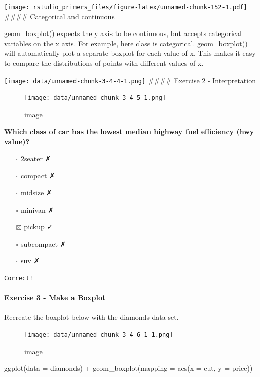 \documentclass[
]{article}
\newenvironment{Shaded}{\begin{snugshade}}{\end{snugshade}}
\newcommand{\AttributeTok}[1]{\textcolor[rgb]{0.77,0.63,0.00}{#1}}
\newcommand{\FunctionTok}[1]{\textcolor[rgb]{0.00,0.00,0.00}{#1}}
\newcommand{\NormalTok}[1]{#1}
\newcommand{\SpecialCharTok}[1]{\textcolor[rgb]{0.00,0.00,0.00}{#1}}
\providecommand{\tightlist}{%
  \setlength{\itemsep}{0pt}\setlength{\parskip}{0pt}}
\begin{document}
\texttt{[image: rstudio\_primers\_files/figure-latex/unnamed-chunk-152-1.pdf]}
\#\#\#\# Categorical and continuous

geom\_boxplot() expects the y axis to be continuous, but accepts
categorical variables on the x axis. For example, here class is
categorical. geom\_boxplot() will automatically plot a separate boxplot
for each value of x. This makes it easy to compare the distributions of
points with different values of x.

\texttt{[image: data/unnamed-chunk-3-4-4-1.png]} \#\#\#\# Exercise 2 -
Interpretation

\begin{figure}
\centering
\texttt{[image: data/unnamed-chunk-3-4-5-1.png]}
\caption{image}
\end{figure}

\textbf{Which class of car has the lowest median highway fuel efficiency
(hwy value)?}

\begin{itemize}
\tightlist
\item[$\square$]
  2seater ✗
\item[$\square$]
  compact ✗
\item[$\square$]
  midsize ✗
\item[$\square$]
  minivan ✗
\item[$\boxtimes$]
  pickup ✓
\item[$\square$]
  subcompact ✗
\item[$\square$]
  suv ✗
\end{itemize}

\begin{verbatim}
Correct!
\end{verbatim}

\hypertarget{exercise-3---make-a-boxplot}{%
\paragraph{Exercise 3 - Make a
Boxplot}\label{exercise-3---make-a-boxplot}}

Recreate the boxplot below with the diamonds data set.

\begin{figure}
\centering
\texttt{[image: data/unnamed-chunk-3-4-6-1-1.png]}
\caption{image}
\end{figure}

\begin{Shaded}
\begin{Highlighting}[]
\FunctionTok{ggplot}\NormalTok{(}\AttributeTok{data =}\NormalTok{ diamonds) }\SpecialCharTok{+}
  \FunctionTok{geom\_boxplot}\NormalTok{(}\AttributeTok{mapping =} \FunctionTok{aes}\NormalTok{(}\AttributeTok{x =}\NormalTok{ cut, }\AttributeTok{y =}\NormalTok{ price))}
\end{Highlighting}
\end{Shaded}
\end{document}
